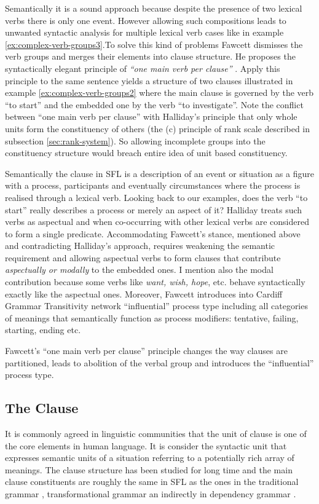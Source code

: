 Semantically it is a sound approach because despite the presence of two lexical verbs there is only one event. However allowing such compositions leads to unwanted syntactic analysis for multiple lexical verb cases like in example \ref{ex:complex-verb-groups3}.To solve this kind of problems Fawcett dismisses the verb groups and merges their elements into clause structure. He proposes the syntactically elegant principle of \textit{``one main verb per clause''} \citep{Fawcett2008}. Apply this principle to the same sentence yields a structure of two clauses illustrated in example \ref{ex:complex-verb-groups2} where the main clause is governed by the verb ``to start'' and the embedded one by the verb ``to investigate''. Note the conflict between ``one main verb per clause'' with Halliday's principle that only whole units form the constituency of others (the (c) principle of rank scale described in subsection \ref{sec:rank-system}). So allowing incomplete groups into the constituency structure would breach entire idea of unit based constituency. 

Semantically the clause in SFL is a description of an event or situation as a figure with a process, participants and eventually circumstances where the process is realised through a lexical verb. Looking back to our examples, does the verb ``to start'' really describes a process or merely an aspect of it? Halliday treats such verbs as aspectual and when co-occurring with other lexical verbs are considered to form a single predicate. Accommodating Fawcett's stance, mentioned above and contradicting Halliday's approach, requires weakening the semantic requirement and allowing aspectual verbs to form clauses that contribute \textit{aspectually or modally} to the embedded ones. I mention also the modal contribution because some verbs like \textit{want, wish, hope}, etc. behave syntactically exactly like the aspectual ones. Moreover, Fawcett introduces into Cardiff Grammar Transitivity network ``influential'' process type including all categories of meanings that semantically function as process modifiers: tentative, failing, starting, ending etc.

Fawcett's ``one main verb per clause'' principle changes the way clauses are partitioned, leads to abolition of the verbal group and introduces the ``influential'' process type.

\subsection{The Clause}
\label{sec:cardiff-clause}
It is commonly agreed in linguistic communities that the unit of clause is one of the core elements in human language. It is consider the syntactic unit that expresses semantic units of a situation referring to a potentially rich array of meanings. The clause structure has been studied for long time and the main clause constituents are roughly the same in SFL as the ones in the traditional grammar \citep{Quirk1985}, transformational grammar \citep{Chomsky1957} an indirectly in dependency grammar \citep{Hudson2010}.

